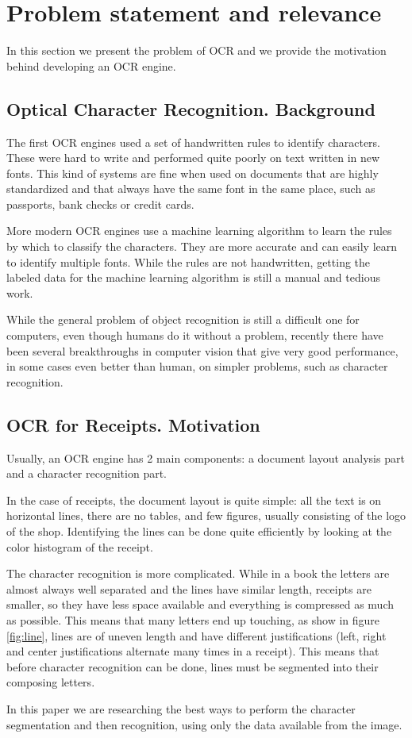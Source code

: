 \section{Problem statement and relevance}
\label{sec:statement}
In this section we present the problem of OCR and we provide the motivation behind developing an OCR engine. 

\subsection{Optical Character Recognition. Background}

The first OCR engines used a set of handwritten rules to identify characters\cite{shepard1971reading}. These were hard to write and performed quite poorly on text written in new fonts. This kind of systems are fine when used on documents that are highly standardized and that always have the same font in the same place, such as passports, bank checks or credit cards. 

More modern OCR engines use a machine learning algorithm to learn the rules by which to classify the characters\cite{smith2007overview}. They are more accurate and can easily learn to identify multiple fonts. While the rules are not handwritten, getting the labeled data for the machine learning algorithm is still a manual and tedious work. 

While the general problem of object recognition is still a difficult one for computers, even though humans do it without a problem, recently there have been several breakthroughs in computer vision that give very good performance, in some cases even better than human, on simpler problems, such as character recognition. 

\subsection{OCR for Receipts. Motivation}
Usually, an OCR engine has 2 main components: a document layout analysis part and a character recognition part. 

In the case of receipts, the document layout is quite simple: all the text is on horizontal lines, there are no tables, and few figures, usually consisting of the logo of the shop. Identifying the lines can be done quite efficiently by looking at the color histogram of the receipt. 

The character recognition is more complicated. While in a book the letters are almost always well separated and the lines have similar length, receipts are smaller, so they have less space available and everything is compressed as much as possible. This means that many letters end up touching, as show in figure \ref{fig:line}, lines are of uneven length and have different justifications (left, right and center justifications alternate many times in a receipt). This means that before character recognition can be done, lines must be segmented into their composing letters. 

In this paper we are researching the best ways to perform the character segmentation and then recognition, using only the data available from the image. 